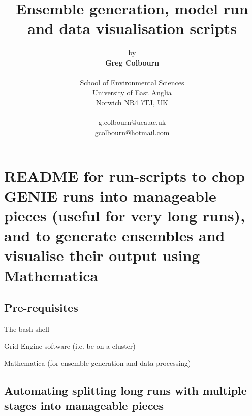 \documentclass[10pt,a4paper, onecolumn]{article}
\title{\textbf{Ensemble generation, model run and data visualisation scripts}}
\author{by\\\textbf{Greg Colbourn}\\\\School of Environmental Sciences\\University of East Anglia\\Norwich NR4 7TJ, UK\\\\g.colbourn@uea.ac.uk\\gcolbourn@hotmail.com}
\begin{document}
\maketitle
\thispagestyle{empty}

\section{README for run-scripts to chop GENIE runs into manageable pieces (useful for very long runs), and to generate ensembles and visualise their output using Mathematica}\label{sec:README}

\subsection{Pre-requisites}

\begin{compactitem}
\item The bash shell
\item Grid Engine software (i.e. be on a cluster)
\item Mathematica (for ensemble generation and data processing)
\end{compactitem}

\subsection{Automating splitting long runs with multiple stages into manageable pieces}\label{sec:Automating splitting long runs with multiple stages into manageable pieces}
\end{document}
